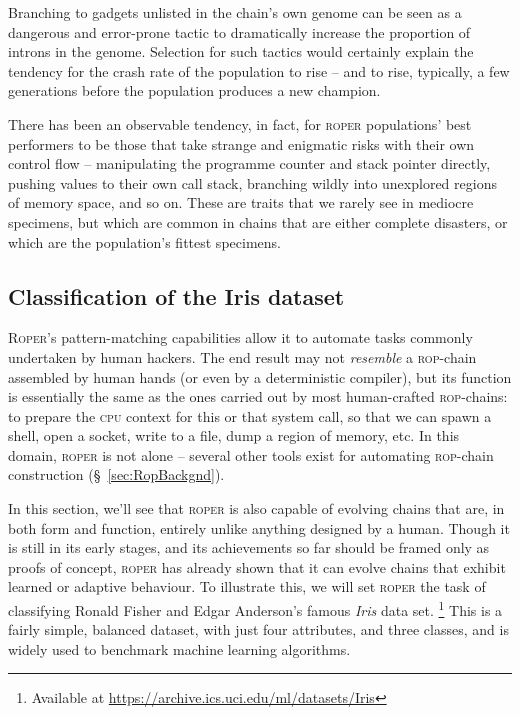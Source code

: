 Branching to gadgets unlisted in the chain's own genome can be
seen as a dangerous and error-prone tactic to dramatically
increase the proportion of introns in the genome. Selection for
such tactics would certainly explain the tendency for the crash
rate of the population to rise -- and to rise, typically, a few
generations before the population produces a new champion. 

There has been an observable tendency, in fact, for
\textsc{roper} populations' best performers to be those that take
strange and enigmatic risks with their own control flow --
manipulating the programme counter and stack pointer directly,
pushing values to their own call stack, branching wildly into
unexplored regions of memory space, and so on. These are traits
that we rarely see in mediocre specimens, but which are common in
chains that are either complete disasters, or which are the
population's fittest specimens. 


\subsection{Classification of the Iris dataset}
\textsc{Roper}'s pattern-matching capabilities allow it to
automate tasks commonly undertaken
by human hackers. The end result may not \emph{resemble} a
\textsc{rop}-chain assembled by human hands (or even by a
deterministic compiler), but its function is essentially the same
as the ones carried out by most human-crafted \textsc{rop}-chains:
to prepare the \textsc{cpu} context for this or that system call,
so that we can spawn a shell, open a socket, write to a file,
dump a region of memory, etc.  In this domain,
\textsc{roper} is not alone -- several other tools exist for
automating \textsc{rop}-chain construction (\S~\ref{sec:RopBackgnd}). 

In this section, we'll see that \textsc{roper} is also capable of
evolving chains that are, in both form and function, entirely
unlike anything designed by a human. Though it is still in its
early stages, and its achievements so far should be framed only
as proofs of concept, \textsc{roper} has already shown that it
can evolve chains that exhibit learned or adaptive behaviour. 
To illustrate this, we will set \textsc{roper} the task of
classifying Ronald Fisher and Edgar Anderson's famous \emph{Iris}
data set.%
\footnote{Available at
\url{https://archive.ics.uci.edu/ml/datasets/Iris}}
This is a fairly simple, balanced dataset, with just four
attributes, and three classes, and is widely used to
benchmark machine learning algorithms.


